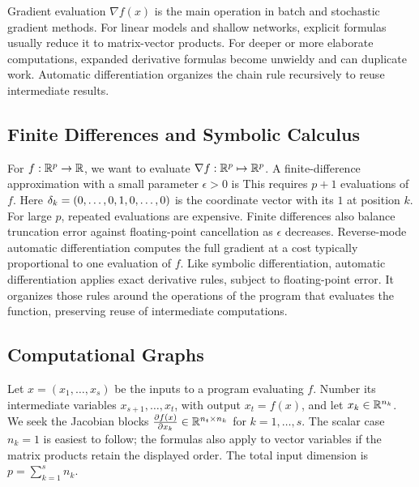 



Gradient evaluation $\nabla f(x)$ is the main operation in batch and stochastic gradient methods. For linear models and shallow networks, explicit formulas usually reduce it to matrix-vector products. For deeper or more elaborate computations, expanded derivative formulas become unwieldy and can duplicate work. Automatic differentiation organizes the chain rule recursively to reuse intermediate results.

\subsection{Finite Differences and Symbolic Calculus}

For $f : \mathbb{R}^p \rightarrow \mathbb{R}$, we want to evaluate $\nabla f : \mathbb{R}^p \mapsto \mathbb{R}^p$. A finite-difference approximation with a small parameter $\epsilon>0$ is
This requires $p+1$ evaluations of $f$. Here $\delta_k=(0,\ldots,0,1,0,\ldots,0)$ is the coordinate vector with its $1$ at position $k$.
%
For large $p$, repeated evaluations are expensive. Finite differences also balance truncation error against floating-point cancellation as $\epsilon$ decreases. Reverse-mode automatic differentiation computes the full gradient at a cost typically proportional to one evaluation of $f$.
%
Like symbolic differentiation, automatic differentiation applies exact derivative rules, subject to floating-point error. It organizes those rules around the operations of the program that evaluates the function, preserving reuse of intermediate computations.


\subsection{Computational Graphs}

Let $x=(x_1,\ldots,x_s)$ be the inputs to a program evaluating $f$. Number its intermediate variables $x_{s+1},\ldots,x_t$, with output $x_t=f(x)$, and let $x_k\in\mathbb{R}^{n_k}$. We seek the Jacobian blocks $\frac{ \partial f(x)}{\partial x_k}\in\mathbb{R}^{n_t\times n_k}$ for $k=1,\ldots,s$. The scalar case $n_k=1$ is easiest to follow; the formulas also apply to vector variables if the matrix products retain the displayed order. The total input dimension is $p=\sum_{k=1}^s n_k$.

